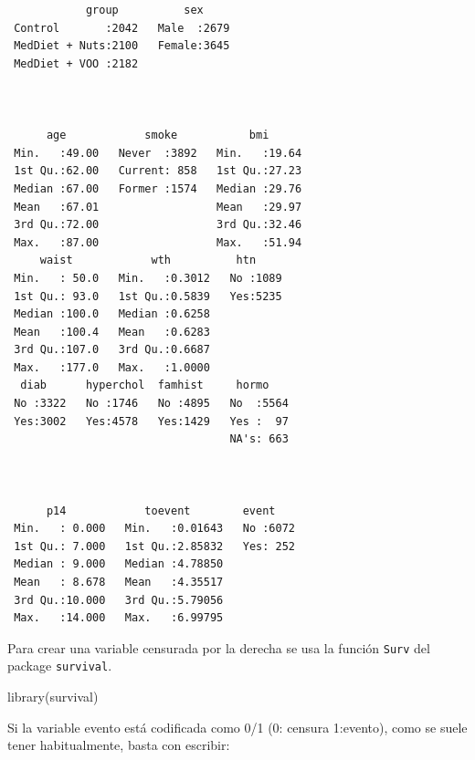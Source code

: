 \documentclass[
]{book}
\newenvironment{Shaded}{\begin{snugshade}}{\end{snugshade}}
\newcommand{\FunctionTok}[1]{\textcolor[rgb]{0.00,0.00,0.00}{#1}}
\newcommand{\NormalTok}[1]{#1}
\newcommand{\SpecialCharTok}[1]{\textcolor[rgb]{0.00,0.00,0.00}{#1}}
\begin{document}
\begin{verbatim}
            group          sex      
 Control       :2042   Male  :2679  
 MedDiet + Nuts:2100   Female:3645  
 MedDiet + VOO :2182                
                                    
                                    
                                    
      age            smoke           bmi       
 Min.   :49.00   Never  :3892   Min.   :19.64  
 1st Qu.:62.00   Current: 858   1st Qu.:27.23  
 Median :67.00   Former :1574   Median :29.76  
 Mean   :67.01                  Mean   :29.97  
 3rd Qu.:72.00                  3rd Qu.:32.46  
 Max.   :87.00                  Max.   :51.94  
     waist            wth          htn      
 Min.   : 50.0   Min.   :0.3012   No :1089  
 1st Qu.: 93.0   1st Qu.:0.5839   Yes:5235  
 Median :100.0   Median :0.6258             
 Mean   :100.4   Mean   :0.6283             
 3rd Qu.:107.0   3rd Qu.:0.6687             
 Max.   :177.0   Max.   :1.0000             
  diab      hyperchol  famhist     hormo     
 No :3322   No :1746   No :4895   No  :5564  
 Yes:3002   Yes:4578   Yes:1429   Yes :  97  
                                  NA's: 663  
                                             
                                             
                                             
      p14            toevent        event     
 Min.   : 0.000   Min.   :0.01643   No :6072  
 1st Qu.: 7.000   1st Qu.:2.85832   Yes: 252  
 Median : 9.000   Median :4.78850             
 Mean   : 8.678   Mean   :4.35517             
 3rd Qu.:10.000   3rd Qu.:5.79056             
 Max.   :14.000   Max.   :6.99795             
\end{verbatim}

Para crear una variable censurada por la derecha se usa la función \texttt{Surv} del package \texttt{survival}.

\begin{Shaded}
\begin{Highlighting}[]
\FunctionTok{library}\NormalTok{(survival)}
\end{Highlighting}
\end{Shaded}

Si la variable evento está codificada como 0/1 (0: censura 1:evento), como se suele tener habitualmente, basta con escribir:

\begin{Shaded}
\end{Shaded}
\end{document}
